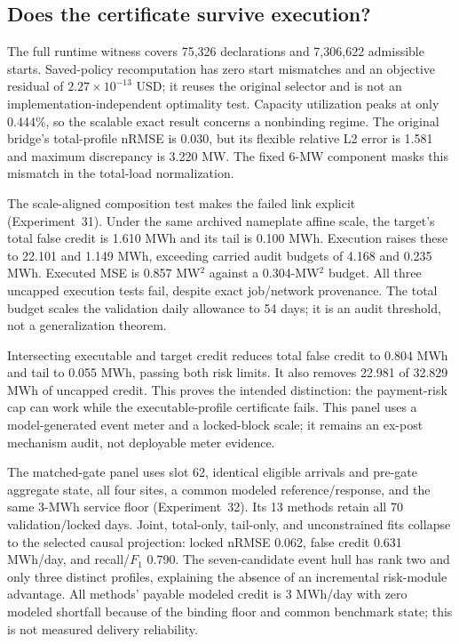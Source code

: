 \documentclass[10pt,journal]{IEEEtran}
\begin{document}
\subsection{Does the certificate survive execution?}

The full runtime witness covers 75,326 declarations and 7,306,622 admissible
starts. Saved-policy recomputation has zero start mismatches and an objective
residual of $2.27\times10^{-13}$ USD; it reuses the original selector and is
not an implementation-independent optimality test. Capacity utilization peaks
at only 0.444\%, so the scalable exact result concerns a nonbinding regime.
The original bridge's total-profile nRMSE is 0.030, but its flexible relative
L2 error is 1.581 and maximum discrepancy is 3.220 MW. The fixed 6-MW component masks this
mismatch in the total-load normalization.

The scale-aligned composition test makes the failed link explicit
(Experiment~31). Under the same archived nameplate affine scale, the target's
total false credit is 1.610 MWh and its tail is 0.100 MWh. Execution raises
these to 22.101 and 1.149 MWh, exceeding carried audit budgets of 4.168 and
0.235 MWh. Executed MSE is 0.857 MW$^2$ against a 0.304-MW$^2$ budget.
All three uncapped execution tests fail, despite exact job/network provenance.
The total budget scales the validation daily allowance to 54 days; it is an
audit threshold, not a generalization theorem.

Intersecting executable and target credit reduces total false credit to
0.804 MWh and tail to 0.055 MWh, passing both risk limits. It also removes
22.981 of 32.829 MWh of uncapped credit. This proves the intended distinction:
the payment-risk cap can work while the executable-profile certificate fails.
This panel uses a model-generated event meter and a locked-block scale;
it remains an ex-post mechanism audit, not deployable meter evidence.

The matched-gate panel uses slot 62, identical eligible arrivals and pre-gate
aggregate state, all four sites, a common modeled reference/response, and the
same 3-MWh service floor (Experiment~32). Its 13 methods retain all 70
validation/locked days. Joint, total-only, tail-only, and unconstrained fits
collapse to the selected causal projection: locked nRMSE 0.062, false credit
0.631 MWh/day, and recall/$F_1$ 0.790. The seven-candidate event hull has
rank two and only three distinct profiles, explaining the absence of an
incremental risk-module advantage. All methods' payable modeled credit is
3 MWh/day with zero modeled shortfall because of the binding floor and common
benchmark state; this is not measured delivery reliability.
\end{document}
